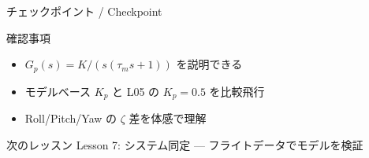 \documentclass[aspectratio=169, 14pt]{beamer}
\begin{document}
\begin{frame}{チェックポイント / Checkpoint}
  \begin{alertblock}{確認事項}
    \begin{itemize}
      \item[$\square$] $G_p(s) = K / (s(\tau_m s + 1))$ を説明できる
      \item[$\square$] モデルベース $K_p$ と L05 の $K_p=0.5$ を比較飛行
      \item[$\square$] Roll/Pitch/Yaw の $\zeta$ 差を体感で理解
    \end{itemize}
  \end{alertblock}

  \vspace{1em}

  \begin{block}{次のレッスン}
    Lesson 7: システム同定 --- フライトデータでモデルを検証
  \end{block}
\end{frame}
\end{document}
